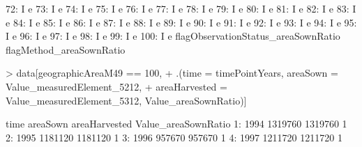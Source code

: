 \documentclass[nojss]{jss}
\begin{document}
\begin{Schunk}
\begin{Soutput}
 72:                                   I                        e
 73:                                   I                        e
 74:                                   I                        e
 75:                                   I                        e
 76:                                   I                        e
 77:                                   I                        e
 78:                                   I                        e
 79:                                   I                        e
 80:                                   I                        e
 81:                                   I                        e
 82:                                   I                        e
 83:                                   I                        e
 84:                                   I                        e
 85:                                   I                        e
 86:                                   I                        e
 87:                                   I                        e
 88:                                   I                        e
 89:                                   I                        e
 90:                                   I                        e
 91:                                   I                        e
 92:                                   I                        e
 93:                                   I                        e
 94:                                   I                        e
 95:                                   I                        e
 96:                                   I                        e
 97:                                   I                        e
 98:                                   I                        e
 99:                                   I                        e
100:                                   I                        e
     flagObservationStatus_areaSownRatio flagMethod_areaSownRatio
\end{Soutput}
\begin{Sinput}
> data[geographicAreaM49 == 100,
+      .(time = timePointYears, areaSown = Value_measuredElement_5212,
+        areaHarvested = Value_measuredElement_5312, Value_areaSownRatio)]
\end{Sinput}
\begin{Soutput}
    time areaSown areaHarvested Value_areaSownRatio
 1: 1994  1319760       1319760                   1
 2: 1995  1181120       1181120                   1
 3: 1996   957670        957670                   1
 4: 1997  1211720       1211720                   1

\end{Soutput}
\end{Schunk}
\end{document}

